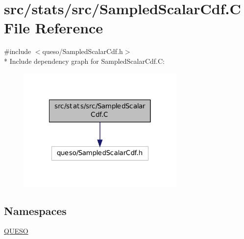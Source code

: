 \hypertarget{_sampled_scalar_cdf_8_c}{\section{src/stats/src/\-Sampled\-Scalar\-Cdf.C File Reference}
\label{_sampled_scalar_cdf_8_c}
}
{\ttfamily \#include $<$queso/\-Sampled\-Scalar\-Cdf.\-h$>$}\\*
Include dependency graph for Sampled\-Scalar\-Cdf.\-C\-:
\nopagebreak
\begin{figure}[H]
\begin{center}
\leavevmode
\includegraphics[width=234pt]{_sampled_scalar_cdf_8_c__incl}
\end{center}
\end{figure}
\subsection*{Namespaces}
\begin{DoxyCompactItemize}
\item 
\hyperlink{namespace_q_u_e_s_o}{Q\-U\-E\-S\-O}
\end{DoxyCompactItemize}
